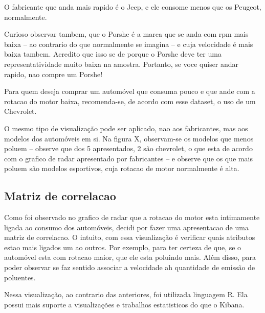 \documentclass[10pt, conference]{IEEEtran}
\begin{document}
O fabricante que anda mais rapido é o Jeep, e ele consome menos que os Peugeot, normalmente.

Curioso observar tambem, que o Porshe é a marca que se anda com rpm mais baixa -- ao contrario do que normalmente
se imagina -- e cuja velocidade é mais baixa tambem. Acredito que isso se de porque o Porshe deve ter uma
representatividade muito baixa na amostra. Portanto, se voce quiser andar rapido, nao compre um Porshe!

Para quem deseja comprar um automóvel que consuma pouco e que ande com a rotacao do motor baixa, recomenda-se,
de acordo com esse dataset, o uso de um Chevrolet.



O mesmo tipo de visualização pode ser aplicado, nao aos fabricantes, mas aos modelos dos automóveis em si.
Na figura X, observam-se os modelos que menos poluem -- observe que dos 5 apresentados, 2 são chevrolet, o
que esta de acordo com o grafico de radar apresentado por fabricantes -- e observe que os que mais poluem
são modelos esportivos, cuja rotacao de motor normalmente é alta.












\subsection{Matriz de correlacao}

Como foi observado no grafico de radar que a rotacao do motor esta intimamente ligada
ao consumo dos automóveis, decidi por fazer uma apresentacao de uma matriz de correlacao. 
O intuito, com essa visualização é verificar quais atributos estao mais ligados um ao
outros. Por exemplo, para ter certeza de que, se o automóvel esta com rotacao maior, que
ele esta poluindo mais. Além disso, para poder observar se faz sentido associar a 
velocidade ah quantidade de emissão de poluentes.

Nessa visualização, ao contrario das anteriores, foi utilizada linguagem R. Ela possui
mais suporte a visualizações e trabalhos estatisticos do que o Kibana. 
\end{document}
